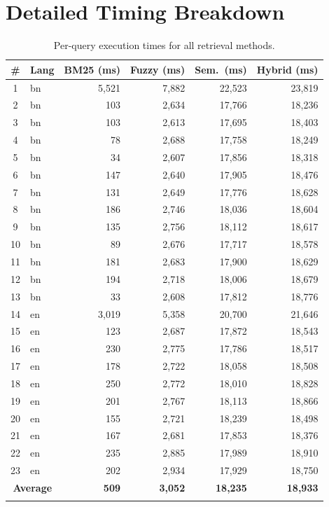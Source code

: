 \documentclass[12pt,a4paper]{article}
\begin{document}
\section{Detailed Timing Breakdown}
\label{appendix:timing}

\begin{longtable}{clrrrr}
\toprule
\textbf{\#} & \textbf{Lang} & \textbf{BM25 (ms)} & \textbf{Fuzzy (ms)} & \textbf{Sem.\ (ms)} & \textbf{Hybrid (ms)} \\
\midrule
\endhead
1  & bn & 5{,}521 & 7{,}882 & 22{,}523 & 23{,}819 \\
2  & bn & 103 & 2{,}634 & 17{,}766 & 18{,}236 \\
3  & bn & 103 & 2{,}613 & 17{,}695 & 18{,}403 \\
4  & bn & 78  & 2{,}688 & 17{,}758 & 18{,}249 \\
5  & bn & 34  & 2{,}607 & 17{,}856 & 18{,}318 \\
6  & bn & 147 & 2{,}640 & 17{,}905 & 18{,}476 \\
7  & bn & 131 & 2{,}649 & 17{,}776 & 18{,}628 \\
8  & bn & 186 & 2{,}746 & 18{,}036 & 18{,}604 \\
9  & bn & 135 & 2{,}756 & 18{,}112 & 18{,}617 \\
10 & bn & 89  & 2{,}676 & 17{,}717 & 18{,}578 \\
11 & bn & 181 & 2{,}683 & 17{,}900 & 18{,}629 \\
12 & bn & 194 & 2{,}718 & 18{,}006 & 18{,}679 \\
13 & bn & 33  & 2{,}608 & 17{,}812 & 18{,}776 \\
14 & en & 3{,}019 & 5{,}358 & 20{,}700 & 21{,}646 \\
15 & en & 123 & 2{,}687 & 17{,}872 & 18{,}543 \\
16 & en & 230 & 2{,}775 & 17{,}786 & 18{,}517 \\
17 & en & 178 & 2{,}722 & 18{,}058 & 18{,}508 \\
18 & en & 250 & 2{,}772 & 18{,}010 & 18{,}828 \\
19 & en & 201 & 2{,}767 & 18{,}113 & 18{,}866 \\
20 & en & 155 & 2{,}721 & 18{,}239 & 18{,}498 \\
21 & en & 167 & 2{,}681 & 17{,}853 & 18{,}376 \\
22 & en & 235 & 2{,}885 & 17{,}989 & 18{,}910 \\
23 & en & 202 & 2{,}934 & 17{,}929 & 18{,}750 \\
\midrule
\multicolumn{2}{c}{\textbf{Average}} & \textbf{509} & \textbf{3{,}052} & \textbf{18{,}235} & \textbf{18{,}933} \\
\bottomrule
\caption{Per-query execution times for all retrieval methods.}
\label{tab:timing_detail}
\end{longtable}
\end{document}

